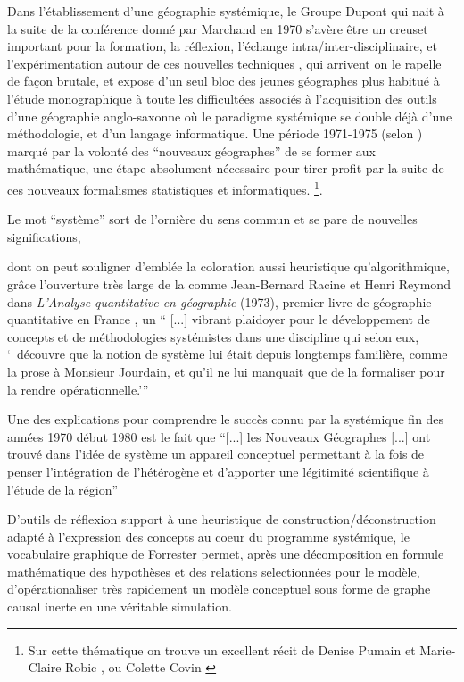 Dans l'établissement d'une géographie systémique, le Groupe Dupont qui nait à la suite de la conférence donné par Marchand en 1970 s'avère être un creuset important pour la formation, la réflexion, l'échange intra/inter-disciplinaire, et l'expérimentation  autour de ces nouvelles techniques \autocite[2]{LeBerre1987}, qui arrivent on le rapelle de façon brutale, et expose d'un seul bloc des jeunes géographes plus habitué à l'étude monographique à toute les difficultées associés à l'acquisition des outils d'une géographie anglo-saxonne où le paradigme systémique se double déjà d'une méthodologie, et d'un langage informatique. Une période 1971-1975 (selon \autocite{Pumain2002}) marqué par la volonté des \enquote{nouveaux géographes} de se former aux mathématique, une étape absolument nécessaire pour tirer profit par la suite de ces nouveaux formalismes statistiques et informatiques. \footnote {Sur cette thématique on trouve un excellent récit de Denise Pumain et Marie-Claire Robic \autocite{Pumain2002}, ou Colette Covin \autocite{Cauvin2007}}.

Le mot \enquote{système} sort de l'ornière du sens commun et se pare de nouvelles significations, 

dont on peut souligner d'emblée la coloration aussi heuristique qu'algorithmique, grâce l'ouverture très large de la  comme Jean-Bernard Racine et Henri Reymond  dans \textit{L’Analyse quantitative en géographie} (1973), premier livre de géographie quantitative en France \autocite{Cauvin2007}, un \enquote{ [...] vibrant plaidoyer pour le développement de concepts et de méthodologies systémistes dans une discipline qui selon eux, \enquote{ découvre que la notion de système lui était depuis longtemps familière, comme la prose à Monsieur Jourdain, et qu'il ne lui manquait que de la formaliser pour la rendre opérationnelle.}} \autocite{Orain2001}

Une des explications pour comprendre le succès connu par la systémique fin des années 1970 début 1980 est le fait que \enquote{[...] les Nouveaux Géographes [...] ont trouvé dans l’idée de système un appareil conceptuel permettant à la fois de penser l’intégration de l’hétérogène et d’apporter une légitimité scientifique à l’étude de la région} \autocite[23]{Orain2001}

D'outils de réflexion support à une heuristique de construction/déconstruction adapté à l'expression des concepts au coeur du programme systémique, le vocabulaire graphique de Forrester permet, après une décomposition en formule mathématique des hypothèses et des relations selectionnées pour le modèle, d'opérationaliser très rapidement un modèle conceptuel sous forme de graphe causal inerte en une véritable simulation. 

